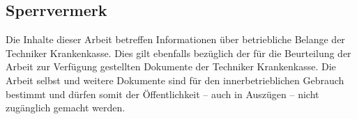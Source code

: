 \subsection*{Sperrvermerk}
\thispagestyle{empty} \addtocounter{page}{-1}
Die Inhalte dieser Arbeit betreffen Informationen über betriebliche Belange der
Techniker Krankenkasse. Dies gilt ebenfalls bezüglich der für die Beurteilung
der Arbeit zur Verfügung gestellten Dokumente der Techniker Krankenkasse. Die
Arbeit selbst und weitere Dokumente sind für den innerbetrieblichen Gebrauch
bestimmt und dürfen somit der Öffentlichkeit – auch in Auszügen – nicht
zugänglich gemacht werden.